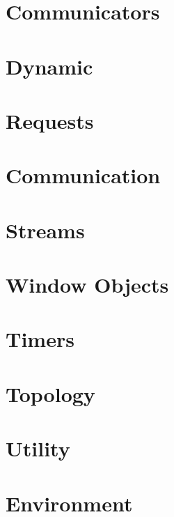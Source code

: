 \documentclass{article}
\begin{document}
\section{Communicators}


\section{Dynamic}


\section{Requests}


\section{Communication}



\section{Streams}



\section{Window Objects}


\section{Timers}


\section{Topology}



\section{Utility}

 

\section{Environment}

\end{document}
